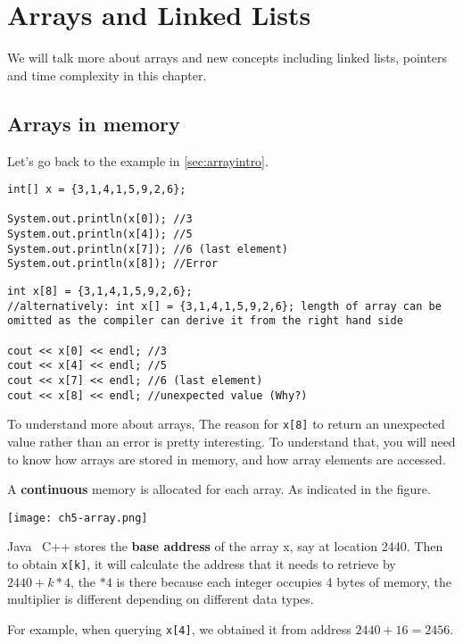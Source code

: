 \chapter{Arrays and Linked Lists}

We will talk more about arrays and new concepts including linked lists, pointers and time complexity in this chapter.

\section{Arrays in memory}

Let's go back to the example in \cref{sec:arrayintro}.

\if{}
\begin{lstlisting}
int[] x = {3,1,4,1,5,9,2,6};

System.out.println(x[0]); //3 
System.out.println(x[4]); //5
System.out.println(x[7]); //6 (last element)
System.out.println(x[8]); //Error 
\end{lstlisting}
\else
\begin{lstlisting}
int x[8] = {3,1,4,1,5,9,2,6};
//alternatively: int x[] = {3,1,4,1,5,9,2,6}; length of array can be omitted as the compiler can derive it from the right hand side

cout << x[0] << endl; //3 
cout << x[4] << endl; //5
cout << x[7] << endl; //6 (last element)
cout << x[8] << endl; //unexpected value (Why?)
\end{lstlisting}
\fi

\if{} To understand more about arrays, \else The reason for \texttt{x[8]} to return an unexpected value rather than an error is pretty interesting. To understand that, \fi you will need to know how arrays are stored in memory, and how array elements are accessed. 

A \textbf{continuous} memory is allocated for each array. As indicated in the figure.

\texttt{[image: ch5-array.png]}

\if{} Java \else ~C++ \fi stores the \textbf{base address} of the array x, say at location 2440. Then to obtain \texttt{x[k]}, it will calculate the address that it needs to retrieve by $2440 + k*4$, the $*4$ is there because each integer occupies 4 bytes of memory, the multiplier is different depending on different data types. 

For example, when querying \texttt{x[4]}, we obtained it from address $2440+16 = 2456$. 

